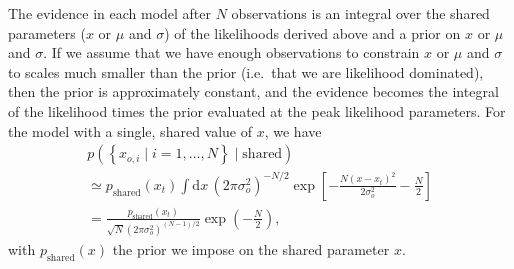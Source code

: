 \documentclass[modern]{aastex631}
\begin{document}
The evidence in each model after $N$ observations is an integral over the shared
parameters ($x$ or $\mu$ and $\sigma$) of the likelihoods derived above and a
prior on $x$ or $\mu$ and $\sigma$.  If we assume that we have enough
observations to constrain $x$ or $\mu$ and $\sigma$ to scales much smaller than
the prior (i.e.\ that we are likelihood dominated), then the prior is
approximately constant, and the evidence becomes the integral of the likelihood
times the prior evaluated at the peak likelihood parameters.  For the model with
a single, shared value of $x$, we have 
\begin{multline}
    \label{eq:fixed-evidence}
    p\left( \left\{ x_{o,i} \mid i = 1, \ldots, N \right\} \mid \mathrm{shared} \right) \\ \simeq p_\mathrm{shared}\left( x_t \right) \int \mathrm{d} x \, \left( 2 \pi \sigma_o^2 \right)^{-N/2} \exp\left[ -\frac{N \left( x - x_t \right)^2}{2 \sigma_o^2} - \frac{N}{2} \right] \\ = \frac{p_\mathrm{shared}\left( x_t \right)}{\sqrt{N} \left( 2 \pi \sigma_o^2 \right)^{(N-1)/2}} \exp\left( - \frac{N}{2} \right),
\end{multline}
with $p_\mathrm{shared}\left( x \right)$ the prior we impose on the shared
parameter $x$.
\end{document}
